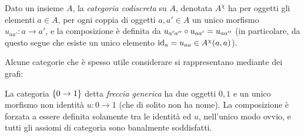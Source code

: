 \begin{example}\label{ex_cat_codiscreta}
	Dato un insieme \(A\), la \emph{categoria codiscreta} su \(A\), denotata \(A^\chi\) ha per oggetti gli elementi \(a\in A\), per ogni coppia di oggetti \(a,a'\in A\) un unico morfismo \(u_{aa'}:a\to a'\), e la composizione è definita da \(u_{a'a''}\circ u_{aa'}=u_{aa''}\) (in particolare, da questo segue che esiste un unico elemento \(\mathrm{id}_a=u_{aa}\in A^\chi(a,a)\)).
\end{example}
Alcune categorie che è spesso utile considerare si rappresentano mediante dei grafi:
\begin{example}\label{ex_cat_freccia}
	La categoria \(\{0\to 1\}\) detta \emph{freccia generica} ha due oggetti \(0,1\) e un unico morfismo non identità \(u : 0\to 1\) (che di solito non ha nome). La composizione è forzata a essere definita solamente tra le identità ed \(u\), nell'unico modo ovvio, e tutti gli assiomi di categoria sono banalmente soddisfatti.
\end{example}
